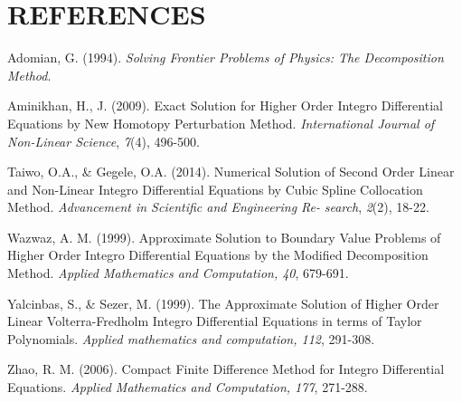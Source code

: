 \documentclass[12pt]{report}
\begin{document}
	
	\newpage
	\chapter*{REFERENCES}
	
	\begin{description}
		\item Adomian, G. (1994). \textit{Solving Frontier Problems of Physics: The Decomposition Method}.
		
		\item Aminikhan, H., J. (2009). Exact Solution for Higher Order Integro Differential Equations by New Homotopy Perturbation Method. \textit{International Journal of Non-Linear Science}, \textit{7}(4), 496-500.	

		\item Taiwo, O.A., \& Gegele, O.A. (2014). Numerical Solution of Second Order Linear and Non-Linear Integro Differential Equations by Cubic Spline Collocation Method. \textit{Advancement in Scientific and Engineering Re-} \textit{search}, \textit{2}(2), 18-22.
		
		\item Wazwaz, A. M. (1999). Approximate Solution to Boundary Value Problems of Higher Order Integro Differential Equations by the Modified Decomposition Method. \textit{Applied Mathematics and Computation, 40}, 679-691.
		
		\item Yalcinbas, S., \& Sezer, M. (1999). The Approximate Solution of Higher Order Linear Volterra-Fredholm Integro Differential Equations in terms of Taylor Polynomials. \textit{Applied mathematics and computation, 112}, 291-308.
		
		\item Zhao, R. M. (2006). Compact Finite Difference Method for Integro Differential Equations. \textit{Applied Mathematics and Computation, 177}, 271-288.
	\end{description}
	
\end{document}
